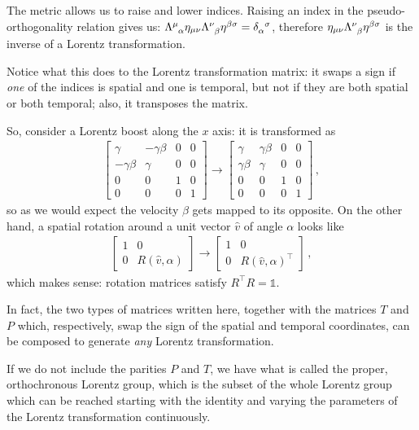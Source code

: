 \documentclass[main.tex]{subfiles}
\begin{document}
The metric allows us to raise and lower indices. Raising an index in the pseudo-orthogonality relation gives us: \(\tensor{\Lambda}{^\mu_\alpha} \eta_{\mu\nu} \tensor{\Lambda}{^\nu_\beta} \eta^{\beta\sigma} =\tensor{\delta}{_\alpha ^\sigma}\), therefore  \(\eta_{\mu\nu} \tensor{\Lambda}{^\nu_\beta} \eta^{\beta\sigma}\) is the inverse of a Lorentz transformation.

\begin{bluebox}

Notice what this does to the Lorentz transformation matrix: it swaps a sign if \emph{one} of the indices is spatial and one is temporal, but not if they are both spatial or both temporal; also, it transposes the matrix. 

So, consider a Lorentz boost along the \(x\) axis: it is transformed as 
%
\begin{subequations}
\begin{align}
\left[\begin{array}{cccc}
  \gamma  & - \gamma \beta  & 0 & 0 \\ 
  -\gamma \beta  & \gamma  & 0 & 0 \\ 
  0 & 0 & 1 & 0 \\ 
  0 & 0 & 0 & 1
\end{array}\right] \rightarrow
\left[\begin{array}{cccc}
  \gamma  & \gamma \beta  & 0 & 0 \\ 
  \gamma \beta  & \gamma  & 0 & 0 \\ 
  0 & 0 & 1 & 0 \\ 
  0 & 0 & 0 & 1
\end{array}\right]
\,,
\end{align}
\end{subequations}
%
so as we would expect the velocity \(\beta \) gets mapped to its opposite. On the other hand, a spatial rotation around a unit vector \(\hat{v}\) of angle \(\alpha \) looks like 
%
\begin{subequations}
\begin{align}
\left[\begin{array}{cc}
1 & 0 \\ 
0 & R(\hat{v}, \alpha )
\end{array}\right] \rightarrow
\left[\begin{array}{cc}
1 & 0 \\ 
0 & R(\hat{v}, \alpha )^{\top}
\end{array}\right]
\,,
\end{align}
\end{subequations}
which makes sense: rotation matrices satisfy \(R^{\top}R = \mathbb{1}\).

In fact, the two types of matrices written here, together with the matrices \(T\) and \(P\) which, respectively, swap the sign of the spatial and temporal coordinates, can be composed to generate \emph{any} Lorentz transformation.

If we do not include the parities \(P\) and \(T\), we have what is called the proper, orthochronous Lorentz group, which is the subset of the whole Lorentz group which can be reached starting with the identity and varying the parameters of the Lorentz transformation continuously. 
\end{bluebox}
\end{document}

